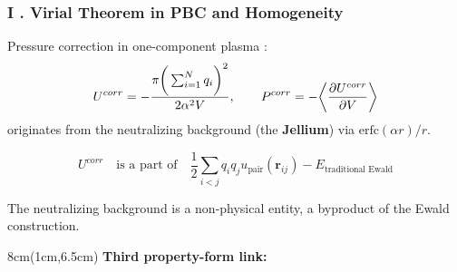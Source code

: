 \documentclass{beamer}
\begin{document}
	\begin{frame}
		\frametitle{I . Virial Theorem in PBC and Homogeneity}    	
		\footnotesize 
		\vspace{-2cm}
		Pressure correction in one-component plasma :
		\begin{equation*}
			U^{corr} = -\dfrac{\pi \bigg{(}\sum_{i=1}^N q_i \bigg{)}^2}{2\alpha^2  V} , \qquad 
			P^{corr} = -\bigg{\langle}  \dfrac{\partial U^{corr}}{\partial V} \bigg{\rangle} 
		\end{equation*}
	    originates from the neutralizing background (the \textbf{Jellium}) via $\text{erfc}(\alpha r)/r$.

		\begin{equation*}
			U^{corr} \quad \text{is a part of} \quad \dfrac{1}{2} \sum_{i< j} q_iq_j u_{\text{pair}}(\mathbf{r}_{ij}) - E_{\text{traditional Ewald}}
		\end{equation*}
		
		The neutralizing background is a non-physical entity, a byproduct of the Ewald construction.
		
		
		\begin{textblock*}{8cm}(1cm,6.5cm)  
			\textbf{Third property-form link: } \\  [5pt]
			
		\end{textblock*}
	\end{frame}
\end{document}

